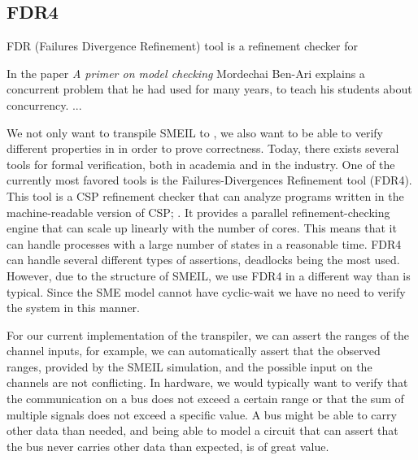 \subsection{FDR4}
FDR (Failures Divergence Refinement) tool is a refinement checker for

In the paper \textit{A primer on model checking}\cite{Ben-ari2010} Mordechai Ben-Ari explains a concurrent problem that he had used for many years, to teach his students about concurrency. ... %


We not only want to transpile SMEIL to \cspm{}, we also want to be able to verify different properties in \cspm{} in order to prove correctness. Today, there exists several tools for formal verification, both in academia and in the industry. One of the currently most favored tools is the Failures-Divergences Refinement tool (FDR4). This tool is a CSP refinement checker that can analyze programs written in the machine-readable version of CSP; \cspm{}.
It provides a parallel refinement-checking engine that can scale up linearly with the number of cores. This means that it can handle processes with a large number of states in a reasonable time. FDR4 can handle several different types of assertions, deadlocks being the most used. However, due to the structure of SMEIL, we use FDR4 in a different way than is typical. Since the SME model cannot have cyclic-wait we have no need to verify the system in this manner.

For our current implementation of the transpiler, we can assert the ranges of the channel inputs, for example, we can automatically assert that the observed ranges, provided by the SMEIL simulation, and the possible input on the \cspm{} channels are not conflicting.
In hardware, we would typically want to verify that the communication on a bus does not exceed a certain range or that the sum of multiple signals does not exceed a specific value. A bus might be able to carry other data than needed, and being able to model a circuit that can assert that the bus never carries other data than expected, is of great value.
\\

